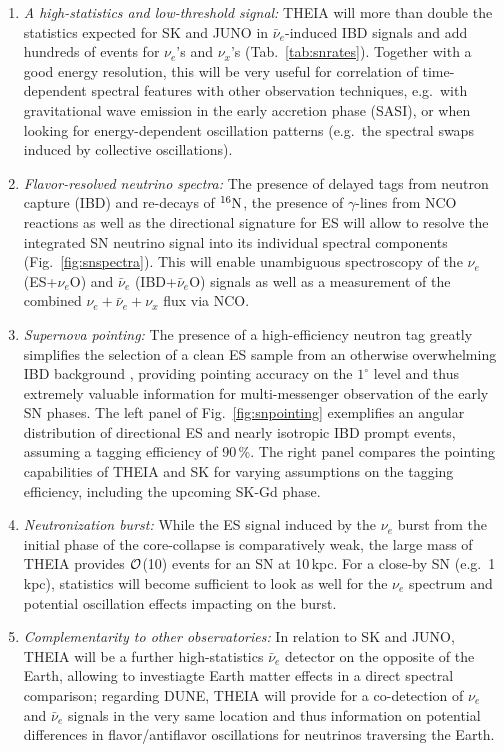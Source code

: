 \begin{enumerate}
\item {\it A high-statistics and low-threshold signal:} THEIA will more than double the statistics expected for SK and JUNO in $\bar\nu_e$-induced IBD signals and add hundreds of events for $\nu_e$'s and $\nu_x$'s (Tab.~\ref{tab:snrates}). Together with a good energy resolution, this will be very useful for correlation of time-dependent spectral features with other observation techniques, e.g.~with gravitational wave emission in the early accretion phase (SASI), or when looking for energy-dependent oscillation patterns (e.g.~the spectral swaps induced by collective oscillations).
\item {\it Flavor-resolved neutrino spectra:} The presence of delayed tags from neutron capture (IBD) and re-decays of ${^{16}{\rm N}}$, the presence of $\gamma$-lines from NCO reactions  as well as the directional signature for ES will allow to resolve the integrated SN neutrino signal into its individual spectral components (Fig.~\ref{fig:snspectra}). This will enable unambiguous spectroscopy of the $\nu_e$ (ES+$\nu_e$O) and $\bar\nu_e$ (IBD+$\bar\nu_e$O) signals as well as a measurement of the combined $\nu_e+\bar\nu_e+\nu_x$ flux via NCO.
\item {\it Supernova pointing:} The presence of a high-efficiency neutron tag greatly simplifies the selection of a clean ES sample from an otherwise overwhelming IBD background \cite{Tomas:2003xn}, providing pointing accuracy on the $1^\circ$ level and thus extremely valuable information for multi-messenger observation of the early SN phases. The left panel of Fig.~\ref{fig:snpointing} exemplifies an angular distribution of directional ES and nearly isotropic IBD prompt events, assuming a tagging efficiency of 90\,\%. The right panel compares the pointing capabilities of THEIA and SK for varying assumptions on the tagging efficiency, including the upcoming SK-Gd phase.
\item {\it Neutronization burst:} While the ES signal induced by the $\nu_e$ burst from the initial phase of the core-collapse is comparatively weak, the large mass of THEIA provides $\cal O$(10) events for an SN at 10\,kpc. For a close-by SN (e.g.~1\,kpc), statistics will become sufficient to look as well for the $\nu_e$ spectrum and potential oscillation effects impacting on the burst.
\item {\it Complementarity to other observatories:} In relation to SK and JUNO, THEIA will be a further high-statistics $\bar\nu_e$ detector on the opposite of the Earth, allowing to investiagte Earth matter effects in a direct spectral comparison; regarding DUNE, THEIA will provide for a co-detection of $\nu_e$ and $\bar\nu_e$ signals in the very same location and thus information on potential differences in flavor/antiflavor oscillations for neutrinos traversing the Earth.
\end{enumerate}
 
